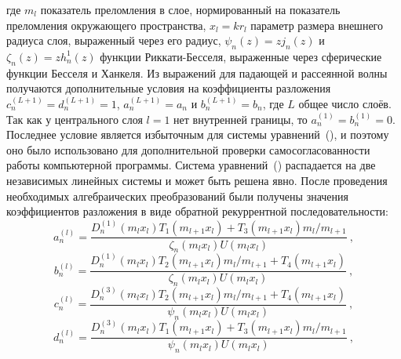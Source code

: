где $m_l$ показатель преломления в слое, нормированный на показатель
преломления окружающего пространства, $x_l=kr_l$ параметр размера
внешнего радиуса слоя, выраженный через его радиус,
$\psi_{n}(z) = z j_n(z)$ и $\zeta_{n}(z) = z h_n^1(z)$ функции
Риккати-Бесселя, выраженные через сферические функции Бесселя и
Ханкеля.  Из выражений для падающей и рассеянной волны получаются
дополнительные условия на коэффициенты разложения
$c_n^{(L+1)}=d_n^{(L+1)}=1$, $a_n^{(L+1)}=a_n$ и $b_n^{(L+1)}=b_n$,
где $L$ общее число слоёв. Так как у центрального слоя $l=1$ нет
внутренней границы, то $a_n^{(1)}=b_n^{(1)}=0$. Последнее условие
является избыточным для системы
уравнений~(), и поэтому оно
было использовано для дополнительной проверки самосогласованности
работы компьютерной программы.  Система
уравнений~() распадается на
две независимых линейных системы и может быть решена явно. После
проведения необходимых алгебраических преобразований были получены
значения коэффициентов разложения в виде обратной рекуррентной
последовательности:
\begin{equation}
\label{eq:6p1}
a^{(l)}_n = \frac
{
    {D^{(1)}_{n}}{\left (m_{l} x_{l} \right )}
    T_1\left (m_{l+1} x_{l} \right )
    +
    T_3\left (m_{l+1} x_{l} \right )
    m_{l}/m_{l+1}
}
{
   \zeta_{n}\left (m_{l} x_{l} \right )
   U\left (m_{l} x_{l} \right )
}\:,
\end{equation}
\begin{equation}
\label{eq:6p2}
b^{(l)}_n = \frac
{
    {D^{(1)}_{n}}{\left (m_{l} x_{l} \right )}
    T_2\left (m_{l+1} x_{l} \right )
    m_{l}/m_{l+1}
    +
    T_4\left (m_{l+1} x_{l} \right )
}
{
   \zeta_{n}\left (m_{l} x_{l} \right )
   U\left (m_{l} x_{l} \right )
}\:,
\end{equation}
\begin{equation}
\label{eq:6p3}
c^{(l)}_n = \frac
{
    {D^{(3)}_{n}}{\left (m_{l} x_{l} \right )}
    T_2\left (m_{l+1} x_{l} \right )
    m_{l}/m_{l+1}
    +
    T_4\left (m_{l+1} x_{l} \right )
}
{
   \psi_{n}\left (m_{l} x_{l} \right )
   U\left (m_{l} x_{l} \right )
}\:,
\end{equation}
\begin{equation}
\label{eq:6p4}
d^{(l)}_n = \frac
{
    {D^{(3)}_{n}}{\left (m_{l} x_{l} \right )}
    T_1\left (m_{l+1} x_{l} \right )
    +
    T_3\left (m_{l+1} x_{l} \right )
    m_{l}/m_{l+1}
}
{
   \psi_{n}\left (m_{l} x_{l} \right )
   U\left (m_{l} x_{l} \right )
}\:,
\end{equation}
